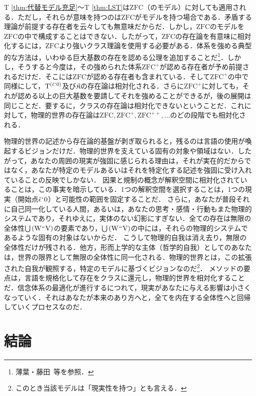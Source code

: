 T \ref{thm:代替モデル充足}〜T \ref{thm:LST}は$\mathrm{ZFC}$（のモデル）に対しても適用される．ただし，それらが意味を持つのは$\mathrm{ZFC}$がモデルを持つ場合である．矛盾する理論が前提する存在者を云々しても無意味だからだ．しかし，$\mathrm{ZFC}$のモデルを$\mathrm{ZFC}$の中で構成することはできない．したがって，$\mathrm{ZFC}$の存在論を有意味に相対化するには，$\mathrm{ZFC}$より強いクラス理論を使用する必要がある．体系を強める典型的な方法は，いわゆる巨大基数の存在を認める公理を追加することだ\footnote{
    薄葉・藤田~\cite{薄葉}等を参照．
}．しかし，そうすると今度は，その強められた体系$\mathrm{ZFC}^{+}$が認める存在者が予め前提されるだけだ．そこには$\mathrm{ZFC}$が認める存在者も含まれている．そして$\mathrm{ZFC}^{+}$の中で同様にして，$\mathrm{T}^{(\breve{\epsilon}{\mspace{1mu}{`}\mspace{1mu}} 0)}$及び$\mathfrak{K}$の存在論は相対化される．さらに$\mathrm{ZFC}^{+}$に対しても，それが認める以上の巨大基数を要請してそれを強めることができるが，後の展開は同じことだ．要するに，クラスの存在論は相対化できないということだ．これに対して，物理的世界の存在論は$ \mathrm{ZFC},\mathrm{ZFC}^{+},\mathrm{ZFC}^{++},\dots $のどの段階でも相対化される．

物理的世界の記述から存在論的基盤が剥ぎ取られると，残るのは言語の使用が喚起するビジョンだけだ．物理的世界を支えている固有の対象や領域はない．したがって，あなたの周囲の現実が強固に感じられる理由は，それが実在的だからではなく，あなたが特定のモデルあるいはそれを特定化する記述を強固に受け入れていることの反映でしかない．
因果と規制の概念が解釈空間に相対化されていることは，この事実を暗示している．1つの解釈空間を選択することは，1つの現実（開始点$ \breve{\epsilon}{\mspace{1mu}{`}\mspace{1mu}} 0 $）と可能性の範囲を固定することだ．
さらに，あなたが普段それに自己同一化している人間，あるいは，あなたの思考・感情・行動もまた物理的システムであり，それゆえに，実体のない幻影にすぎない．全ての存在は無限の全体性${\textstyle\bigcup}\mspace{3mu}(\mathrm{W}{\mspace{1mu}{``}\mspace{1mu}}\mathrm{V})$の要素であり，${\textstyle\bigcup}\mspace{3mu}(\mathrm{W}{\mspace{1mu}{``}\mspace{1mu}}\mathrm{V})$の中には，それらの物理的システムであるような固有の対象はないからだ．
こうして物理的自我は消え去り，無限の全体性だけが残される．他方，形而上学的な主体（哲学的自我）としてのあなたは，世界の限界として無限の全体性に同一化される．物理的世界とは，この拡張された自我が観照する，特定のモデルに基づくビジョンなのだ\footnote{このとき当該モデルは「現実性を持つ」とも言える．}．
メソッドの要点は，言語を規格化して存在をクラスに還元し，物理的世界を相対化することだ．信念体系の最適化が進行するにつれて，現実があなたに与える影響は小さくなっていく．それはあなたが本来のあり方へと，全てを内在する全体性へと回帰していくプロセスなのだ．

\section{結論}
\label{sec:結論}

